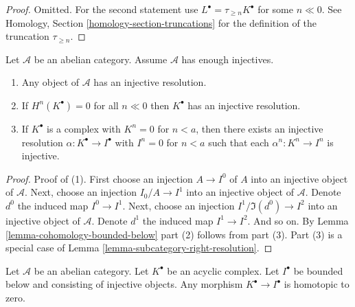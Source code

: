 \begin{proof}
Omitted. For the second statement use
$L^\bullet = \tau_{\geq n}K^\bullet$ for
some $n \ll 0$. See
Homology, Section \ref{homology-section-truncations}
for the definition of the truncation $\tau_{\geq n}$.
\end{proof}

\begin{lemma}
\label{lemma-injective-resolutions-exist}
Let $\mathcal{A}$ be an abelian category.
Assume $\mathcal{A}$ has enough injectives.
\begin{enumerate}
\item Any object of $\mathcal{A}$ has an injective resolution.
\item If $H^n(K^\bullet) = 0$ for all $n \ll 0$ then
$K^\bullet$ has an injective resolution.
\item If $K^\bullet$ is a complex with $K^n = 0$ for $n < a$, then
there exists an injective resolution $\alpha : K^\bullet \to I^\bullet$
with $I^n = 0$ for $n < a$ such that each $\alpha^n : K^n \to I^n$ is
injective.
\end{enumerate}
\end{lemma}

\begin{proof}
Proof of (1). First choose an injection $A \to I^0$ of $A$ into an
injective object of $\mathcal{A}$. Next, choose an injection
$I_0/A \to I^1$ into an injective object of $\mathcal{A}$.
Denote $d^0$ the induced map $I^0 \to I^1$.
Next, choose an injection $I^1/\Im(d^0) \to I^2$ into
an injective object of $\mathcal{A}$. Denote $d^1$ the induced
map $I^1 \to I^2$. And so on.
By Lemma \ref{lemma-cohomology-bounded-below} part (2) follows from part (3).
Part (3) is a special case of
Lemma \ref{lemma-subcategory-right-resolution}.
\end{proof}

\begin{lemma}
\label{lemma-acyclic-is-zero}
Let $\mathcal{A}$ be an abelian category.
Let $K^\bullet$ be an acyclic complex.
Let $I^\bullet$ be bounded below and consisting of injective objects.
Any morphism $K^\bullet \to I^\bullet$ is homotopic to zero.
\end{lemma}

